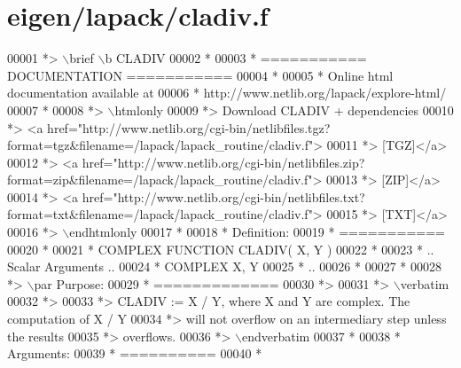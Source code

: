\hypertarget{eigen_2lapack_2cladiv_8f_source}{}\section{eigen/lapack/cladiv.f}
\label{eigen_2lapack_2cladiv_8f_source}

\begin{DoxyCode}
00001 \textcolor{comment}{*> \(\backslash\)brief \(\backslash\)b CLADIV}
00002 \textcolor{comment}{*}
00003 \textcolor{comment}{*  =========== DOCUMENTATION ===========}
00004 \textcolor{comment}{*}
00005 \textcolor{comment}{* Online html documentation available at }
00006 \textcolor{comment}{*            http://www.netlib.org/lapack/explore-html/ }
00007 \textcolor{comment}{*}
00008 \textcolor{comment}{*> \(\backslash\)htmlonly}
00009 \textcolor{comment}{*> Download CLADIV + dependencies }
00010 \textcolor{comment}{*> <a
       href="http://www.netlib.org/cgi-bin/netlibfiles.tgz?format=tgz&filename=/lapack/lapack\_routine/cladiv.f"> }
00011 \textcolor{comment}{*> [TGZ]</a> }
00012 \textcolor{comment}{*> <a
       href="http://www.netlib.org/cgi-bin/netlibfiles.zip?format=zip&filename=/lapack/lapack\_routine/cladiv.f"> }
00013 \textcolor{comment}{*> [ZIP]</a> }
00014 \textcolor{comment}{*> <a
       href="http://www.netlib.org/cgi-bin/netlibfiles.txt?format=txt&filename=/lapack/lapack\_routine/cladiv.f"> }
00015 \textcolor{comment}{*> [TXT]</a>}
00016 \textcolor{comment}{*> \(\backslash\)endhtmlonly }
00017 \textcolor{comment}{*}
00018 \textcolor{comment}{*  Definition:}
00019 \textcolor{comment}{*  ===========}
00020 \textcolor{comment}{*}
00021 \textcolor{comment}{*       COMPLEX FUNCTION CLADIV( X, Y )}
00022 \textcolor{comment}{* }
00023 \textcolor{comment}{*       .. Scalar Arguments ..}
00024 \textcolor{comment}{*       COMPLEX            X, Y}
00025 \textcolor{comment}{*       ..}
00026 \textcolor{comment}{*  }
00027 \textcolor{comment}{*}
00028 \textcolor{comment}{*> \(\backslash\)par Purpose:}
00029 \textcolor{comment}{*  =============}
00030 \textcolor{comment}{*>}
00031 \textcolor{comment}{*> \(\backslash\)verbatim}
00032 \textcolor{comment}{*>}
00033 \textcolor{comment}{*> CLADIV := X / Y, where X and Y are complex.  The computation of X / Y}
00034 \textcolor{comment}{*> will not overflow on an intermediary step unless the results}
00035 \textcolor{comment}{*> overflows.}
00036 \textcolor{comment}{*> \(\backslash\)endverbatim}
00037 \textcolor{comment}{*}
00038 \textcolor{comment}{*  Arguments:}
00039 \textcolor{comment}{*  ==========}
00040 \textcolor{comment}{*}

\end{DoxyCode}
